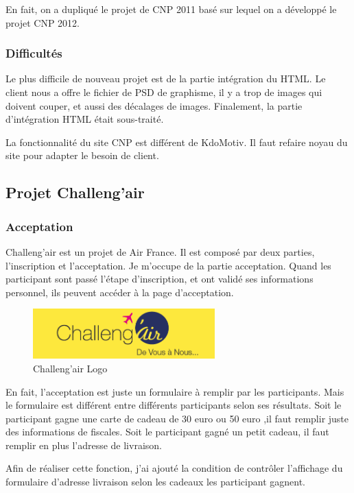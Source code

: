 En fait, on a dupliqué le projet de CNP 2011 basé sur lequel on a développé le projet CNP 2012.

\subsubsection{Difficultés} 
Le plus difficile de nouveau projet est de la partie intégration du HTML. Le client nous a offre le fichier de PSD de graphisme, il y a trop de images qui doivent couper, et aussi des décalages de images. Finalement, la partie d'intégration HTML était sous-traité. 

La fonctionnalité du site CNP est différent de KdoMotiv. Il faut refaire noyau du site pour adapter le besoin de client. 



\subsection{Projet Challeng'air}

\subsubsection{Acceptation}
Challeng'air est un projet de Air France.  Il est composé par deux parties, l'inscription et l'acceptation. Je m'occupe de la partie acceptation.
Quand les participant sont passé l'étape d'inscription, et ont validé ses informations personnel, ils peuvent accéder à la page d'acceptation. 
\begin{figure}[hbtp]
\caption{Challeng'air Logo}
\centering
\includegraphics[width=7cm]{body/images/challengair.png}
\end{figure}

En fait, l'acceptation est juste un formulaire à remplir par les participants.  Mais le formulaire est différent entre différents participants selon ses résultats. Soit le participant gagne une carte de cadeau de 30 euro ou 50 euro ,il faut remplir juste des informations de fiscales. Soit le participant gagné un petit cadeau, il faut remplir en plus l'adresse de livraison. 

Afin de réaliser cette fonction, j'ai ajouté la condition de contrôler l'affichage du formulaire d'adresse livraison  selon les cadeaux les participant gagnent. 


